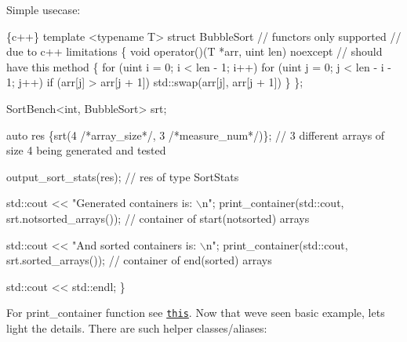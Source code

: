 Simple usecase\+: 
\begin{DoxyCode}
\{c++\}
template <typename T>
struct BubbleSort
// functors only supported
// due to c++ limitations
\{
      void operator()(T *arr, uint len) noexcept
    // should have this method
      \{
          for (uint i = 0; i < len - 1; i++)
              for (uint j = 0; j < len - i - 1; j++)
                if (arr[j] > arr[j + 1])
                    std::swap(arr[j], arr[j + 1])
      \}
\};

SortBench<int, BubbleSort> srt;

auto res \{srt(4 /*array\_size*/, 3 /*measure\_num*/)\};
// 3 different arrays of size 4 being generated and tested

output\_sort\_stats(res);
// res of type SortStats

std::cout << "Generated containers is: \(\backslash\)n";
print\_container(std::cout, srt.notsorted\_arrays());
// container of start(notsorted) arrays

std::cout << "And sorted containers is: \(\backslash\)n";
print\_container(std::cout, srt.sorted\_arrays());
// container of end(sorted) arrays

std::cout << std::endl;
\}
\end{DoxyCode}
 For print\+\_\+container function see \href{https://gist.github.com/B1Z0N/e122def9e42e2ee198519bb70642feda}{\tt this}. Now that we\textquotesingle{}ve seen basic example, let\textquotesingle{}s light the details. There are such helper classes/aliases\+:
